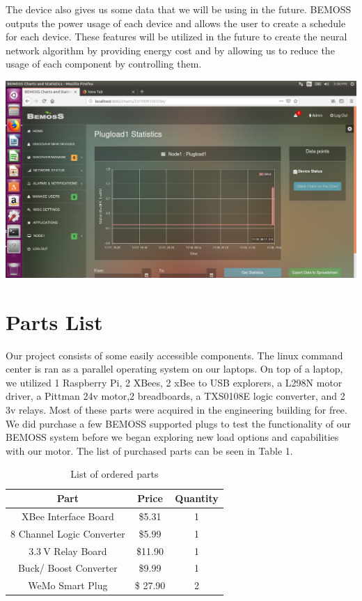 \documentclass[letterpaper,12pt]{article}   %
\begin{document}
The device also gives us some data that we will be using in the future. BEMOSS outputs the power usage of each device and allows the user to create a schedule for each device. These features will be utilized in the future to create the neural network algorithm by providing energy cost and by allowing us to reduce the usage of each component by controlling them.
\begin{center}
    \includegraphics[width=.68\textwidth, keepaspectratio=true]{figs/img/plugloadStats.png}
    
\end{center}

\section{Parts List}
Our project consists of some easily accessible components. The linux command center is ran as a parallel operating system on our laptops. On top of a laptop, we utilized 1 Raspberry Pi, 2 XBees, 2 xBee to USB explorers, a L298N motor driver, a Pittman 24v motor,2 breadboards, a TXS0108E logic converter, and 2 3v relays. Most of these parts were acquired in the engineering building for free. We did purchase a few BEMOSS supported plugs to test the functionality of our BEMOSS system before we began exploring new load options and capabilities with our motor. The list of purchased parts can be seen in Table 1. 

\begin{table}
\centering
\begin{tabular}{|c|c|c|}
    \hline
    Part & Price & Quantity \\
    \hline 
    XBee Interface Board & \$5.31 & 1 \\
    \hline
    8 Channel Logic Converter & \$5.99 & 1 \\
    \hline
    $\SI{3.3}{\volt}$ Relay Board & \$11.90 & 1\\
    \hline 
    Buck/ Boost Converter & \$9.99 & 1\\
    \hline 
    WeMo Smart Plug & \$ 27.90 & 2\\
    \hline
\end{tabular}
\caption{List of ordered parts}
\label{tab:ordparts}
\end{table}
\end{document}
